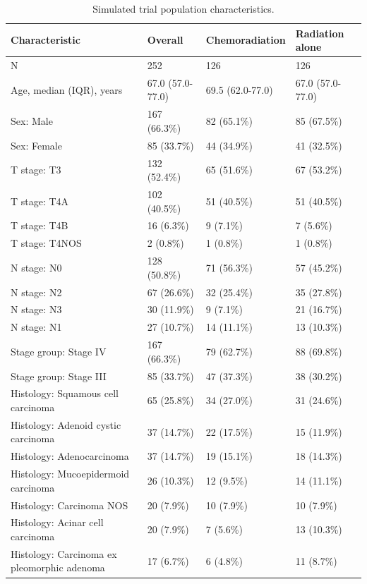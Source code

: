 \documentclass[10pt,twocolumn]{article}
\begin{document}
\begin{table}[t]
\centering
\caption{Simulated trial population characteristics.}
\label{tab:1}
\scriptsize
\setlength{\tabcolsep}{3pt}
\renewcommand{\arraystretch}{0.82}
\begin{tabular}{p{}p{}p{}p{}}
\toprule
Characteristic & Overall & Chemoradiation & Radiation alone \\
\midrule
N & 252 & 126 & 126 \\
Age, median (IQR), years & 67.0 (57.0-77.0) & 69.5 (62.0-77.0) & 67.0 (57.0-77.0) \\
Sex: Male & 167 (66.3\%) & 82 (65.1\%) & 85 (67.5\%) \\
Sex: Female & 85 (33.7\%) & 44 (34.9\%) & 41 (32.5\%) \\
T stage: T3 & 132 (52.4\%) & 65 (51.6\%) & 67 (53.2\%) \\
T stage: T4A & 102 (40.5\%) & 51 (40.5\%) & 51 (40.5\%) \\
T stage: T4B & 16 (6.3\%) & 9 (7.1\%) & 7 (5.6\%) \\
T stage: T4NOS & 2 (0.8\%) & 1 (0.8\%) & 1 (0.8\%) \\
N stage: N0 & 128 (50.8\%) & 71 (56.3\%) & 57 (45.2\%) \\
N stage: N2 & 67 (26.6\%) & 32 (25.4\%) & 35 (27.8\%) \\
N stage: N3 & 30 (11.9\%) & 9 (7.1\%) & 21 (16.7\%) \\
N stage: N1 & 27 (10.7\%) & 14 (11.1\%) & 13 (10.3\%) \\
Stage group: Stage IV & 167 (66.3\%) & 79 (62.7\%) & 88 (69.8\%) \\
Stage group: Stage III & 85 (33.7\%) & 47 (37.3\%) & 38 (30.2\%) \\
Histology: Squamous cell carcinoma & 65 (25.8\%) & 34 (27.0\%) & 31 (24.6\%) \\
Histology: Adenoid cystic carcinoma & 37 (14.7\%) & 22 (17.5\%) & 15 (11.9\%) \\
Histology: Adenocarcinoma & 37 (14.7\%) & 19 (15.1\%) & 18 (14.3\%) \\
Histology: Mucoepidermoid carcinoma & 26 (10.3\%) & 12 (9.5\%) & 14 (11.1\%) \\
Histology: Carcinoma NOS & 20 (7.9\%) & 10 (7.9\%) & 10 (7.9\%) \\
Histology: Acinar cell carcinoma & 20 (7.9\%) & 7 (5.6\%) & 13 (10.3\%) \\
Histology: Carcinoma ex pleomorphic adenoma & 17 (6.7\%) & 6 (4.8\%) & 11 (8.7\%) \\

\end{tabular}
\end{table}
\end{document}
